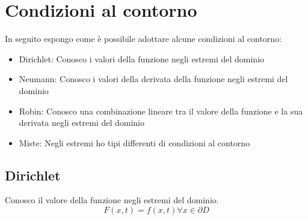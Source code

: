 \section{Condizioni al contorno}
In seguito espongo come \`e possibile adottare alcune condizioni al contorno:
\begin{itemize}
\item Dirichlet: Conosco i valori della funzione negli estremi del dominio
\item Neumann: Conosco i valori della derivata della funzione negli estremi del dominio
\item Robin: Conosco una combinazione lineare tra il valore della funzione e la sua derivata negli estremi del dominio
\item Miste: Negli estremi ho tipi differenti di condizioni al contorno
\end{itemize}
\subsection{Dirichlet}
Conosco il valore della funzione negli estremi del dominio.
\begin{equation}
F(x,t) = f(x,t) \forall x \in \partial D
\end{equation}

